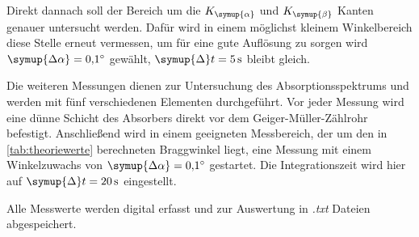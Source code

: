 Direkt dannach soll der Bereich um die $K_{\symup{\alpha}}$ und $K_{\symup{\beta}}$ Kanten genauer untersucht werden.
Dafür wird in einem möglichst kleinem Winkelbereich diese Stelle erneut vermessen, um für eine gute Auflösung
zu sorgen wird $\symup{\Delta\alpha}=\qty{0.1}{\degree}$ gewählt, $\symup{\Delta} t=\qty{5}{\second}$ bleibt gleich.

Die weiteren Messungen dienen zur Untersuchung des Absorptionsspektrums und werden mit fünf verschiedenen
Elementen durchgeführt.
Vor jeder Messung wird eine dünne Schicht des Absorbers direkt vor dem Geiger-Müller-Zählrohr befestigt.
Anschließend wird in einem geeigneten Messbereich, der um den in \autoref{tab:theoriewerte} berechneten Braggwinkel liegt,
eine Messung mit einem Winkelzuwachs von $\symup{\Delta\alpha}=\qty{0.1}{\degree}$ gestartet.
Die Integrationszeit wird hier auf $\symup{\Delta} t=\qty{20}{\second}$ eingestellt.

Alle Messwerte werden digital erfasst und zur Auswertung in \textit{.txt} Dateien abgespeichert.